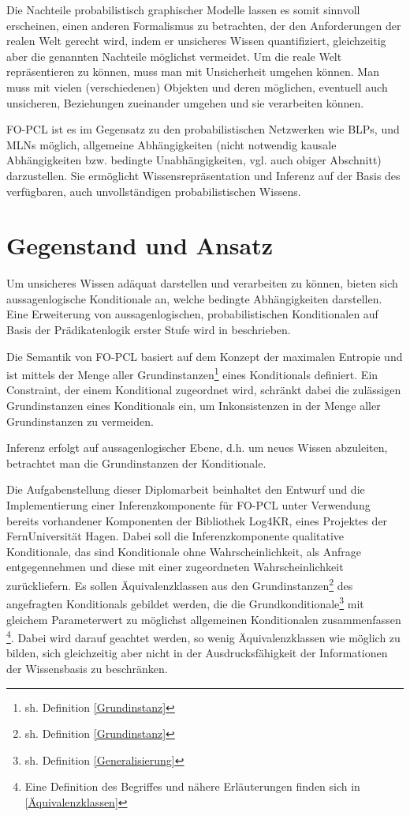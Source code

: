 \documentclass[draft]{scrreprt}
\begin{document}
Die Nachteile probabilistisch graphischer Modelle lassen es somit sinnvoll erscheinen, einen anderen Formalismus zu betrachten, der den Anforderungen der realen Welt  gerecht wird, indem er unsicheres Wissen quantifiziert, gleichzeitig aber die genannten Nachteile möglichst vermeidet. Um die reale Welt repräsentieren zu können, muss man mit Unsicherheit umgehen können. Man muss mit vielen (verschiedenen) Objekten und deren möglichen, eventuell auch unsicheren,  Beziehungen zueinander umgehen und sie verarbeiten können.

FO-PCL ist es im Gegensatz zu den probabilistischen Netzwerken wie BLPs, und MLNs möglich, allgemeine Abhängigkeiten (nicht notwendig kausale Abhängigkeiten bzw. bedingte Unabhängigkeiten, vgl. auch obiger Abschnitt) darzustellen. Sie ermöglicht Wissensrepräsentation und Inferenz auf der Basis des verfügbaren, auch unvollständigen probabilistischen Wissens. 


\section{Gegenstand und Ansatz}
Um unsicheres Wissen adäquat darstellen und verarbeiten zu können, bieten sich aussagenlogische Konditionale  an, welche bedingte Abhängigkeiten darstellen. Eine Erweiterung von aussagenlogischen, probabilistischen Konditionalen auf Basis der Prädikatenlogik erster Stufe wird in \cite[Kap. 6]{Fis10} beschrieben.

 Die Semantik von FO-PCL basiert auf dem Konzept der maximalen Entropie und ist mittels der Menge aller Grundinstanzen\footnote{sh. Definition \ref{Grundinstanz}} eines Konditionals definiert. Ein Constraint, der einem Konditional zugeordnet wird, schränkt dabei die zulässigen Grundinstanzen eines Konditionals ein, um Inkonsistenzen in der Menge aller Grundinstanzen zu vermeiden.
 
Inferenz erfolgt auf aussagenlogischer Ebene, d.h. um neues Wissen abzuleiten, betrachtet man die Grundinstanzen der Konditionale.


Die Aufgabenstellung dieser Diplomarbeit beinhaltet den Entwurf und die Implementierung einer Inferenzkomponente für FO-PCL unter Verwendung bereits vorhandener Komponenten der Bibliothek Log4KR, eines Projektes der FernUniversität Hagen. Dabei soll die Inferenzkomponente qualitative Konditionale, das sind Konditionale ohne Wahrscheinlichkeit, als Anfrage entgegennehmen und diese mit einer zugeordneten Wahrscheinlichkeit zurückliefern. Es sollen Äquivalenzklassen   aus den Grundinstanzen\footnote{sh. Definition \ref{Grundinstanz}}  des angefragten Konditionals gebildet werden, die die Grundkonditionale\footnote{sh. Definition \ref{Generalisierung}} mit gleichem Parameterwert zu möglichst allgemeinen Konditionalen zusammenfassen \footnote{Eine Definition des Begriffes und nähere Erläuterungen finden sich in \ref{Äquivalenzklassen}}. Dabei wird darauf geachtet werden, so wenig Äquivalenzklassen wie möglich zu bilden, sich gleichzeitig aber nicht in der Ausdrucksfähigkeit der Informationen der Wissensbasis zu beschränken.
\end{document}
